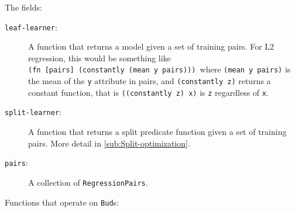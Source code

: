 \documentclass[10pt,openany]{article}
\numberwithin{definition}{section}
\numberwithin{example}{section}
\numberwithin{equation}{section}
\numberwithin{figure}{section}
\begin{document}
The fields:
\begin{description}
\item [{\texttt{leaf-learner}:}] A function that returns a model given
a set of training pairs. For L2 regression, this would be something
like \texttt{(fn~{[}pairs{]}~(constantly~(mean~y~pairs))) }where
\texttt{(mean~y~pairs)} is the mean of the \texttt{y} attribute
in pairs, and \texttt{(constantly~z)} returns a constant function,
that is \texttt{((constantly~z)~x)} is \texttt{z} regardless of
\texttt{x}.
\item [{\texttt{split-learner}:}] A function that returns a split predicate
function given a set of training pairs. More detail in \autoref{sub:Split-optimization}.
\item [{\texttt{pairs}:}] A collection of \texttt{RegressionPairs}.
\end{description}
Functions that operate on \texttt{Bud}s:
\end{document}
